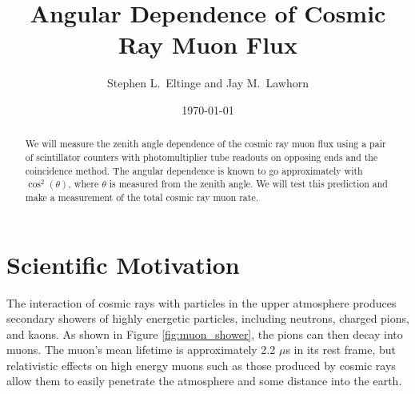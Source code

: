 \usepackage{lgrind} %
\usepackage{chapterbib} %
\usepackage{color} %
\usepackage{graphics}      %
\usepackage[pdftex]{graphicx} %
\usepackage{longtable}     %
\usepackage{epsf} %
\usepackage{bm}            %
\usepackage{thumbpdf}
\usepackage[colorlinks=true]{hyperref} %
\usepackage{multirow}
\usepackage{subfigure}

\newcommand{\cd}{$\cdot$}

%
%


\title{Angular Dependence of Cosmic Ray Muon Flux}
\author{Stephen L.\ Eltinge and Jay M.\ Lawhorn}
\date{\today}

\begin{abstract}
We will measure the zenith angle dependence of the cosmic ray muon flux using a pair of scintillator counters with photomultiplier tube readouts on opposing ends and the coincidence method. The angular dependence is known to go approximately with $\cos^2(\theta)$, where $\theta$ is measured from the zenith angle. We will test this prediction and make a measurement of the total cosmic ray muon rate.
\end{abstract}

\maketitle

\section{Scientific Motivation}

The interaction of cosmic rays with particles in the upper atmosphere produces secondary showers of highly energetic particles, including neutrons, charged pions, and kaons. As shown in Figure \ref{fig:muon_shower}, the pions can then decay into muons. The muon's mean lifetime is approximately 2.2 $\mu$s in its rest frame, but relativistic effects on high energy muons such as those produced by cosmic rays allow them to easily penetrate the atmosphere and some distance into the earth.


